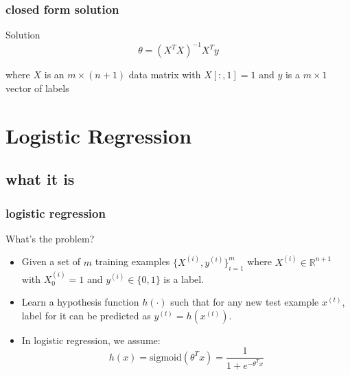 \documentclass[11pt]{beamer}
\begin{document}
\begin{frame}
	\frametitle{closed form solution}
	\begin{block}{Solution}
	\begin{equation*}	
		\theta = (X^T X)^{-1} X^T y 
	\end{equation*} 

	where $X$ is an $m \times (n+1)$ data matrix with $X[:,1] = 1$ and $y$ is a $m \times 1$ vector of labels
   	\end{block}
\end{frame}

\section{Logistic Regression}
\subsection{what it is}
\begin{frame}
	\frametitle{\textbf{logistic regression}}
	
	\begin{block}{What's the problem?}
	\begin{itemize}
		\item Given a set of $m$ training examples $\{X^{(i)}, y^{(i)}\}_{i=1}^m$ 
		where $X^{(i)} \in \mathbb{R}^{n+1}$
		with $X^{(i)}_0 = 1$ and $y^{(i)} \in \{0, 1\}$ is a label.
		\item Learn a hypothesis function $h(\cdot)$ such that for any new test example $x^{(t)}$, label for it can be predicted as 
		$y^{(t)} = h(x^{(t)})$.
		\item In logistic regression, we assume:
		\begin{equation*}
		h(x) = \textrm{sigmoid}(\theta^T x) = \frac{1}{1 + e^{-\theta^T x}}
		\end{equation*}
	\end{itemize}
	\end{block}
\end{frame}
\end{document}

